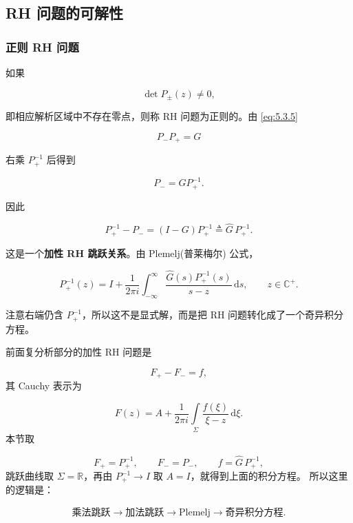 \documentclass[
    lang=cn,
    scheme=chinese,
    mode=simple,
    device=normal,
    color=blue,
    math=cm,
    thmcnt=section,
    12pt,
    nowatermark
]{elegantbook}
\begin{document}
\subsection{RH 问题的可解性}

\subsubsection{正则 RH 问题}

如果

\begin{equation}
    \det P_\pm(z)\ne0,
    \tag{5.3.10}
    \label{eq:5.3.10}
\end{equation}

即相应解析区域中不存在零点，则称 RH 问题为正则的。由 \eqref{eq:5.3.5}

\[
    P_-P_+=G
\]

右乘 $P_+^{-1}$ 后得到

\[
    P_-=GP_+^{-1}.
\]

因此

\[
    P_+^{-1}-P_-
    =
    (I-G)P_+^{-1}
    \triangleq
    \widehat G\,P_+^{-1}.
\]

这是一个\textbf{加性 RH 跳跃关系}。由 Plemelj(普莱梅尔) 公式，

\[
    P_+^{-1}(z)
    =
    I+
    \dfrac{1}{2\pi i}
    \int_{-\infty}^{\infty}
    \dfrac{\widehat G(s)P_+^{-1}(s)}{s-z}\,\mathrm ds,
    \qquad
    z\in\mathbb{C}^+.
\]

注意右端仍含 $P_+^{-1}$，所以这不是显式解，而是把 RH 问题转化成了一个奇异积分方程。

\begin{callout}
    前面复分析部分的加性 RH 问题是

    \[
        F_+-F_-=f,
    \]
    其 Cauchy 表示为

    \[
        F(z)
        =
        A+
        \dfrac{1}{2\pi i}
        \int\limits_\Sigma
        \dfrac{f(\xi)}{\xi-z}\,\mathrm d\xi.
    \]
    本节取

    \[
        F_+=P_+^{-1},
        \qquad
        F_-=P_-,
        \qquad
        f=\widehat G\,P_+^{-1},
    \]
    跳跃曲线取 $\Sigma=\mathbb{R}$，再由 $P_+^{-1}\to I$ 取 $A=I$，就得到上面的积分方程。
    所以这里的逻辑是：

    \[
        \text{乘法跳跃}
        \longrightarrow
        \text{加法跳跃}
        \longrightarrow
        \text{Plemelj}
        \longrightarrow
        \text{奇异积分方程}.
    \]

\end{callout}
\end{document}
